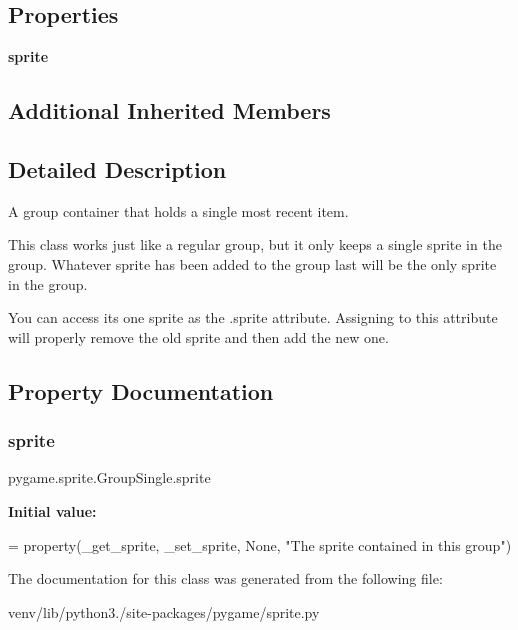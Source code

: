 \subsection*{Properties}
\begin{DoxyCompactItemize}
\item 
{\bfseries sprite}
\end{DoxyCompactItemize}
\subsection*{Additional Inherited Members}


\subsection{Detailed Description}
\begin{DoxyVerb}A group container that holds a single most recent item.

This class works just like a regular group, but it only keeps a single
sprite in the group. Whatever sprite has been added to the group last will
be the only sprite in the group.

You can access its one sprite as the .sprite attribute.  Assigning to this
attribute will properly remove the old sprite and then add the new one.\end{DoxyVerb}
 

\subsection{Property Documentation}
\mbox{\label{classpygame_1_1sprite_1_1_group_single_af23e082e19bc3644c2b44cb616dee225}} 
\subsubsection{\texorpdfstring{sprite}{sprite}}
{\footnotesize\ttfamily pygame.\+sprite.\+Group\+Single.\+sprite\hspace{0.3cm}{\ttfamily [static]}}

{\bfseries Initial value\+:}
\begin{DoxyCode}
=  property(\_get\_sprite,
                      \_set\_sprite,
                      \textcolor{keywordtype}{None},
                      \textcolor{stringliteral}{"The sprite contained in this group"})
\end{DoxyCode}


The documentation for this class was generated from the following file\+:\begin{DoxyCompactItemize}
\item 
venv/lib/python3./site-\/packages/pygame/sprite.\+py\end{DoxyCompactItemize}
